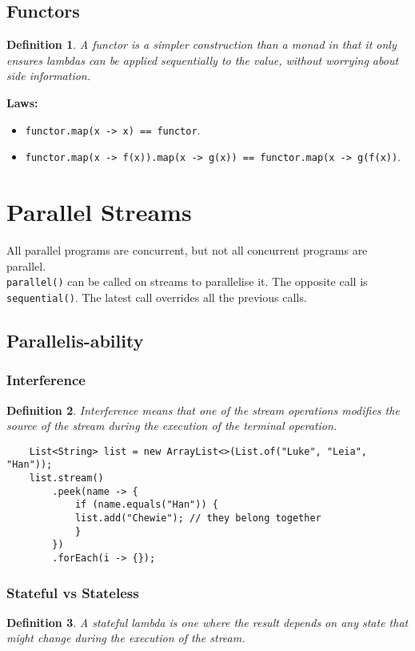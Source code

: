 \documentclass[10pt,landscape,a4paper]{article}
\newtheorem{definition}{Definition}[section]
\begin{document}
\begin{multicols*}{4}
\subsection{Functors}
\begin{definition}
     A functor is a simpler construction than a monad in that it only ensures lambdas can be applied sequentially to the value, without worrying about side information.
\end{definition}
\textbf{Laws:}
\begin{itemize}
    \item \texttt{functor.map(x -> x) == functor}.
    \item \texttt{functor.map(x -> f(x)).map(x -> g(x)) == functor.map(x -> g(f(x))}.
\end{itemize}

\section{Parallel Streams}
All parallel programs are concurrent, but not all concurrent programs are parallel. \\
\texttt{parallel()} can be called on streams to parallelise it. The opposite call is \texttt{sequential()}. The latest call overrides all the previous calls.\\

\subsection{Parallelis-ability}
\subsubsection{Interference}
\begin{definition}
    Interference means that one of the stream operations modifies the source of the stream during the execution of the terminal operation.
\end{definition}

\begin{lstlisting}
    List<String> list = new ArrayList<>(List.of("Luke", "Leia", "Han"));
    list.stream()
        .peek(name -> {
            if (name.equals("Han")) {
            list.add("Chewie"); // they belong together
            }
        })
        .forEach(i -> {});
\end{lstlisting}

\subsubsection{Stateful vs Stateless}
\begin{definition}
    A stateful lambda is one where the result depends on any state that might change during the execution of the stream.
\end{definition}


\end{multicols*}
\end{document}
